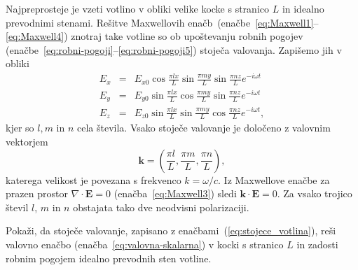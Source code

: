Najpreprosteje je vzeti votlino v obliki velike kocke s stranico
$L$ in idealno prevodnimi stenami. Rešitve Maxwellovih enačb~(enačbe~\ref{eq:Maxwell1}--\ref{eq:Maxwell4}) 
znotraj take votline so ob upoštevanju robnih pogojev 
(enačbe~\ref{eq:robni-pogoji}--\ref{eq:robni-pogoji5}) 
stoječa valovanja. Zapišemo jih v obliki
\begin{eqnarray}
E_{x} & = & E_{x0}\cos\frac{\pi lx}{L}\sin\frac{\pi my}{L}\sin\frac{\pi nz}{L}e^{-i\omega t}\nonumber \\
E_{y} & = & E_{y0}\sin\frac{\pi lx}{L}\cos\frac{\pi my}{L}\sin\frac{\pi nz}{L}e^{-i\omega t}\nonumber \\
E_{z} & = & E_{z0}\sin\frac{\pi lx}{L}\sin\frac{\pi my}{L}\cos\frac{\pi nz}{L}e^{-i\omega t},
\label{eq:stojece_votlina}
\end{eqnarray}
kjer so $l,m$ in $n$ cela števila. Vsako stoječe valovanje je določeno z valovnim 
vektorjem
\begin{equation}
\mathbf{k}=\left(\frac{\pi l}{L},\frac{\pi m}{L},\frac{\pi n}{L}\right),
\end{equation} 
katerega velikost je povezana s frekvenco $k = \omega/c$.
Iz Maxwellove enačbe za prazen prostor $\nabla\cdot\mathbf{E}=0$ (enačba~\ref{eq:Maxwell3})
sledi $\mathbf{k}\cdot\mathbf{E}=0$. 
Za vsako trojico števil $l$, $m$ in $n$ obstajata tako dve
neodvisni polarizaciji.

\begin{definition}
 Pokaži, da stoječe valovanje, zapisano z enačbami~(\ref{eq:stojece_votlina}), reši 
 valovno enačbo (enačba~\ref{eq:valovna-skalarna}) v 
 kocki s stranico $L$ in zadosti robnim pogojem idealno prevodnih sten votline.
\end{definition}

